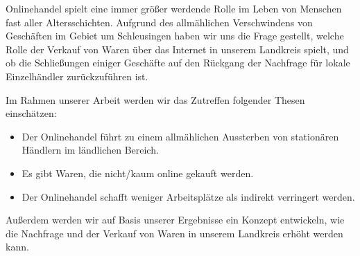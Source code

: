 



Onlinehandel spielt eine immer größer werdende Rolle im Leben von Menschen fast aller Altersschichten. Aufgrund des allmählichen Verschwindens von Geschäften im Gebiet um Schleusingen haben wir uns die Frage gestellt, welche Rolle der Verkauf von Waren über das Internet in unserem Landkreis spielt, und ob die Schließungen einiger Geschäfte auf den Rückgang der Nachfrage für lokale Einzelhändler zurückzuführen ist.

Im Rahmen unserer Arbeit werden wir das Zutreffen folgender Thesen einschätzen:
\begin{itemize}
    \item Der Onlinehandel führt zu einem allmählichen Aussterben von stationären Händlern im ländlichen Bereich.
    
    \item Es gibt Waren, die nicht/kaum online gekauft werden.

    \item Der Onlinehandel schafft weniger Arbeitsplätze als indirekt verringert werden.
\end{itemize}

Außerdem werden wir auf Basis unserer Ergebnisse ein Konzept entwickeln, wie die Nachfrage und der Verkauf von Waren in unserem Landkreis erhöht werden kann.
